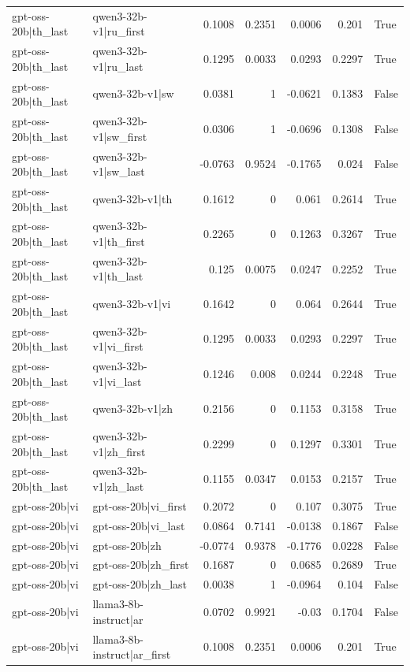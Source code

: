\begin{table}
\begin{tabular}{l l r r r r l}
gpt-oss-20b|th_last & qwen3-32b-v1|ru_first & 0.1008 & 0.2351 & 0.0006 & 0.201 & True \\
gpt-oss-20b|th_last & qwen3-32b-v1|ru_last & 0.1295 & 0.0033 & 0.0293 & 0.2297 & True \\
gpt-oss-20b|th_last & qwen3-32b-v1|sw & 0.0381 & 1 & -0.0621 & 0.1383 & False \\
gpt-oss-20b|th_last & qwen3-32b-v1|sw_first & 0.0306 & 1 & -0.0696 & 0.1308 & False \\
gpt-oss-20b|th_last & qwen3-32b-v1|sw_last & -0.0763 & 0.9524 & -0.1765 & 0.024 & False \\
gpt-oss-20b|th_last & qwen3-32b-v1|th & 0.1612 & 0 & 0.061 & 0.2614 & True \\
gpt-oss-20b|th_last & qwen3-32b-v1|th_first & 0.2265 & 0 & 0.1263 & 0.3267 & True \\
gpt-oss-20b|th_last & qwen3-32b-v1|th_last & 0.125 & 0.0075 & 0.0247 & 0.2252 & True \\
gpt-oss-20b|th_last & qwen3-32b-v1|vi & 0.1642 & 0 & 0.064 & 0.2644 & True \\
gpt-oss-20b|th_last & qwen3-32b-v1|vi_first & 0.1295 & 0.0033 & 0.0293 & 0.2297 & True \\
gpt-oss-20b|th_last & qwen3-32b-v1|vi_last & 0.1246 & 0.008 & 0.0244 & 0.2248 & True \\
gpt-oss-20b|th_last & qwen3-32b-v1|zh & 0.2156 & 0 & 0.1153 & 0.3158 & True \\
gpt-oss-20b|th_last & qwen3-32b-v1|zh_first & 0.2299 & 0 & 0.1297 & 0.3301 & True \\
gpt-oss-20b|th_last & qwen3-32b-v1|zh_last & 0.1155 & 0.0347 & 0.0153 & 0.2157 & True \\
gpt-oss-20b|vi & gpt-oss-20b|vi_first & 0.2072 & 0 & 0.107 & 0.3075 & True \\
gpt-oss-20b|vi & gpt-oss-20b|vi_last & 0.0864 & 0.7141 & -0.0138 & 0.1867 & False \\
gpt-oss-20b|vi & gpt-oss-20b|zh & -0.0774 & 0.9378 & -0.1776 & 0.0228 & False \\
gpt-oss-20b|vi & gpt-oss-20b|zh_first & 0.1687 & 0 & 0.0685 & 0.2689 & True \\
gpt-oss-20b|vi & gpt-oss-20b|zh_last & 0.0038 & 1 & -0.0964 & 0.104 & False \\
gpt-oss-20b|vi & llama3-8b-instruct|ar & 0.0702 & 0.9921 & -0.03 & 0.1704 & False \\
gpt-oss-20b|vi & llama3-8b-instruct|ar_first & 0.1008 & 0.2351 & 0.0006 & 0.201 & True \\

\end{tabular}
\end{table}
